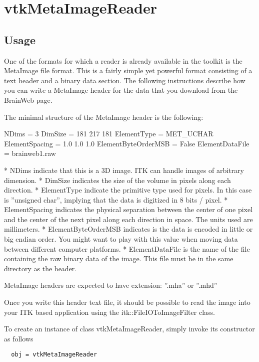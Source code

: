 \section{vtkMetaImageReader}

\subsection{Usage}

 One of the formats for which a reader is already available in the toolkit is
 the MetaImage file format. This is a fairly simple yet powerful format
 consisting of a text header and a binary data section. The following
 instructions describe how you can write a MetaImage header for the data that
 you download from the BrainWeb page.

 The minimal structure of the MetaImage header is the following:

    NDims = 3
    DimSize = 181 217 181
    ElementType = MET\_UCHAR
    ElementSpacing = 1.0 1.0 1.0
    ElementByteOrderMSB = False
    ElementDataFile = brainweb1.raw

    * NDims indicate that this is a 3D image. ITK can handle images of
      arbitrary dimension.
    * DimSize indicates the size of the volume in pixels along each
      direction.
    * ElementType indicate the primitive type used for pixels. In this case
      is ''unsigned char'', implying that the data is digitized in 8 bits /
      pixel.
    * ElementSpacing indicates the physical separation between the center of
      one pixel and the center of the next pixel along each direction in space.
      The units used are millimeters.
    * ElementByteOrderMSB indicates is the data is encoded in little or big
      endian order. You might want to play with this value when moving data
      between different computer platforms.
    * ElementDataFile is the name of the file containing the raw binary data
      of the image. This file must be in the same directory as the header. 

 MetaImage headers are expected to have extension: ''.mha'' or ''.mhd''

 Once you write this header text file, it should be possible to read the
 image into your ITK based application using the itk::FileIOToImageFilter
 class.

To create an instance of class vtkMetaImageReader, simply
invoke its constructor as follows
\begin{verbatim}
  obj = vtkMetaImageReader
\end{verbatim}
